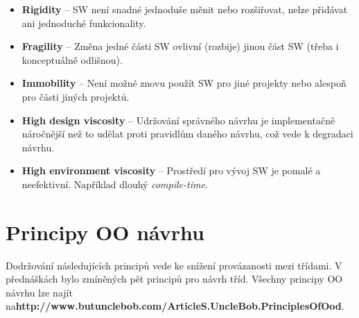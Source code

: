 \documentclass{szzclass}
\begin{document}
\begin{itemize}
      \item \textbf{Rigidity} -- SW není snadné jednoduše měnit nebo rozšiřovat,
      nelze přidávat ani jednoduché funkcionality.
      \item \textbf{Fragility} -- Změna jedné části SW ovlivní (rozbije) jinou
      část SW (třeba i konceptuálně odlišnou).
      \item \textbf{Immobility} -- Není možné znovu použít SW pro jiné projekty
      nebo alespoň pro části jiných projektů.
      \item \textbf{High design viscosity} -- Udržování správného návrhu je implementačně náročnější
      než to udělat proti pravidlům daného návrhu, což vede k degradaci návrhu.
      \item \textbf{High environment viscosity} -- Prostředí pro vývoj SW je pomalé a neefektivní.
      Například dlouhý \textit{compile-time}.
\end{itemize}


\section{Principy OO návrhu}

Dodržování následujících principů vede ke snížení provázanosti mezi třídami.
V přednáškách bylo zmíněných pět principů pro návrh tříd.
Všechny principy OO návrhu lze najít na\linebreak \textbf{http://www.butunclebob.com/ArticleS.UncleBob.PrinciplesOfOod}.
\end{document}
